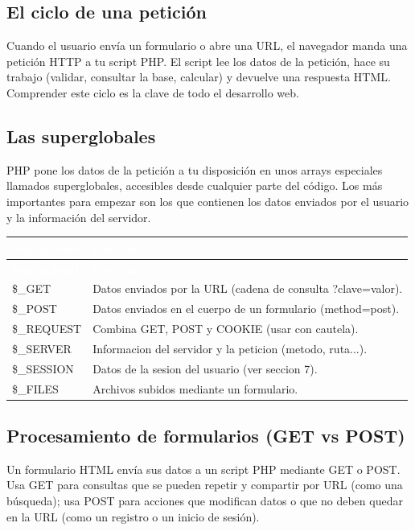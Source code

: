 \documentclass[11pt]{article}
\begin{document}
\subsection{El ciclo de una petición}
Cuando el usuario envía un formulario o abre una URL, el navegador manda una petición HTTP a tu script PHP. El script lee los datos de la petición, hace su trabajo (validar, consultar la base, calcular) y devuelve una respuesta HTML. Comprender este ciclo es la clave de todo el desarrollo web.

\subsection{Las superglobales}
PHP pone los datos de la petición a tu disposición en unos arrays especiales llamados superglobales, accesibles desde cualquier parte del código. Los más importantes para empezar son los que contienen los datos enviados por el usuario y la información del servidor.

{\renewcommand{\arraystretch}{1.25}
\begin{longtable}{>{\raggedright\arraybackslash}p{3cm} >{\raggedright\arraybackslash}p{12.4cm}}
\rowcolor{phpazul}\textcolor{white}{\textbf{Superglobal}} & \textcolor{white}{\textbf{Contenido}} \\
\endfirsthead
\rowcolor{phpazul}\textcolor{white}{\textbf{Superglobal}} & \textcolor{white}{\textbf{Contenido}} \\
\endhead
\ttfamily\color{phpazul}\$\_GET & Datos enviados por la URL (cadena de consulta ?clave=valor). \\ \hline
\ttfamily\color{phpazul}\$\_POST & Datos enviados en el cuerpo de un formulario (method=post). \\ \hline
\ttfamily\color{phpazul}\$\_REQUEST & Combina GET, POST y COOKIE (usar con cautela). \\ \hline
\ttfamily\color{phpazul}\$\_SERVER & Informacion del servidor y la peticion (metodo, ruta...). \\ \hline
\ttfamily\color{phpazul}\$\_SESSION & Datos de la sesion del usuario (ver seccion 7). \\ \hline
\ttfamily\color{phpazul}\$\_FILES & Archivos subidos mediante un formulario. \\ \hline
\end{longtable}}
\subsection{Procesamiento de formularios (GET vs POST)}
Un formulario HTML envía sus datos a un script PHP mediante GET o POST. Usa GET para consultas que se pueden repetir y compartir por URL (como una búsqueda); usa POST para acciones que modifican datos o que no deben quedar en la URL (como un registro o un inicio de sesión).
\end{document}
